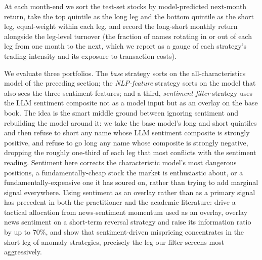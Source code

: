 At each month-end we sort the test-set stocks by model-predicted next-month return, take the top quintile as the long leg and the bottom quintile as the short leg, equal-weight within each leg, and record the long-short monthly return alongside the leg-level turnover (the fraction of names rotating in or out of each leg from one month to the next, which we report as a gauge of each strategy's trading intensity and its exposure to transaction costs).

We evaluate three portfolios. The \textit{base} strategy sorts on the all-characteristics model of the preceding section; the \textit{NLP-feature} strategy sorts on the model that also sees the three sentiment features; and a third, \textit{sentiment-filter} strategy uses the LLM sentiment composite not as a model input but as an overlay on the base book. The idea is the smart middle ground between ignoring sentiment and rebuilding the model around it: we take the base model's long and short quintiles and then refuse to short any name whose LLM sentiment composite is strongly positive, and refuse to go long any name whose composite is strongly negative, dropping the roughly one-third of each leg that most conflicts with the sentiment reading. Sentiment here corrects the characteristic model's most dangerous positions, a fundamentally-cheap stock the market is enthusiastic about, or a fundamentally-expensive one it has soured on, rather than trying to add marginal signal everywhere. Using sentiment as an overlay rather than as a primary signal has precedent in both the practitioner and the academic literature: \cite{uhl2015news} drive a tactical allocation from news-sentiment momentum used as an overlay, \cite{hafez2014web} overlay news sentiment on a short-term reversal strategy and raise its information ratio by up to 70\%, and \cite{stambaugh2012short} show that sentiment-driven mispricing concentrates in the short leg of anomaly strategies, precisely the leg our filter screens most aggressively.

